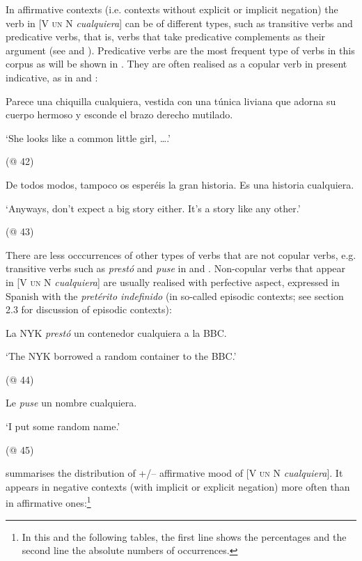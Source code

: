 \documentclass[output=paper]{langscibook}
\begin{document}
  In affirmative contexts (i.e. contexts without explicit or implicit negation) the verb in [V \textsc{un} N \textit{cualquiera}] can be of different types, such as transitive verbs and predicative verbs, that is, verbs that take predicative complements as their argument (see  and ). Predicative verbs are the most frequent type of verbs in this corpus as will be shown in . They are often realised as a copular verb in present indicative, as in  and :

\label{bkm:Ref42868883}  Parece una chiquilla cualquiera, vestida con una túnica liviana que adorna su cuerpo hermoso y esconde el brazo derecho mutilado.

  ‘She looks like a common little girl, ….’ 

  (@ 42)

\label{bkm:Ref42868888}  De todos modos, tampoco os esperéis la gran historia. Es una historia cualquiera.

  ‘Anyways, don’t expect a big story either. It’s a story like any other.’

  (@ 43) 

There are less occcurrences of other types of verbs that are not copular verbs, e.g. transitive verbs such as \textit{prestó} and \textit{puse} in  and . Non-copular verbs that appear in [V \textsc{un} N \textit{cualquiera}] are usually realised with perfective aspect, expressed in Spanish with the \textit{pretérito indefinido} (in so-called episodic contexts; see section 2.3 for discussion of episodic contexts):

\label{bkm:Ref42868870}  La NYK \textit{prestó} un contenedor cualquiera a la BBC.

  ‘The NYK borrowed a random container to the BBC.’

  (@ 44)

\label{bkm:Ref42869017}  Le \textit{puse} un nombre cualquiera. 

  ‘I put some random name.’

  (@ 45)

 summarises the distribution of +/– affirmative mood of [V \textsc{un} N \textit{cualquiera}]. It appears in negative contexts (with implicit or explicit negation) more often than in affirmative ones:\footnote{In this and the following tables, the first line shows the percentages and the second line the absolute numbers of occurrences.} 
\end{document}
